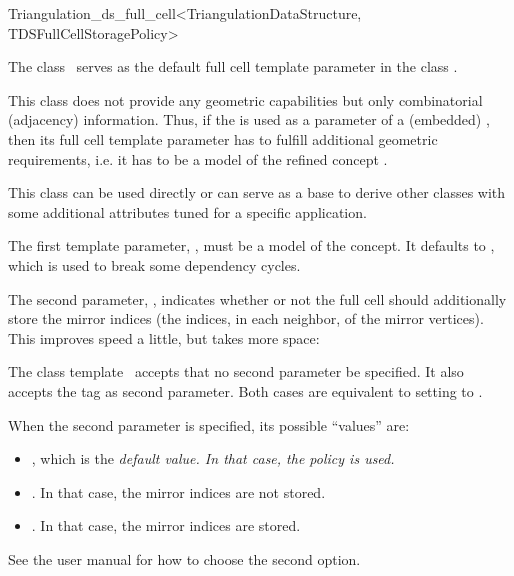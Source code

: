 \begin{ccRefClass}{Triangulation_ds_full_cell<TriangulationDataStructure, TDSFullCellStoragePolicy>}

\ccDefinition

The class \ccRefName\ serves as the default full cell template parameter in the
class .

This class does not provide any geometric capabilities but only combinatorial
(adjacency) information. Thus, if the  is
used as a parameter of a (embedded) , then its full cell template
parameter has to fulfill additional geometric requirements, i.e. it has to be
a model of the refined concept .

This class can be used directly or can serve as a base to derive other classes
with some additional attributes tuned for a specific application.


\ccParameters

The first template parameter, , must be a model of the
 concept. It defaults to , which is
used to break some dependency cycles.

The second parameter, , indicates whether or not
the full cell should additionally store the mirror indices (the indices, in each
neighbor, of the mirror vertices). This improves speed a little, but takes
more space:

The class template \ccRefName\ accepts that no second parameter be specified.
It also accepts the tag  as second parameter. Both cases are
equivalent to setting  to
.

When the second parameter is specified, its possible ``values''
are:\begin{itemize}

\item {}, which is the \em{default} value. In that case, the
policy  is used.

\item {}. In that case, the mirror
indices are {not stored}.

\item {}. In that case, the mirror
indices are stored.
\end{itemize}
See the user manual  for how to choose the second option.

\ccIsModel


\ccSeeAlso


\end{ccRefClass}
